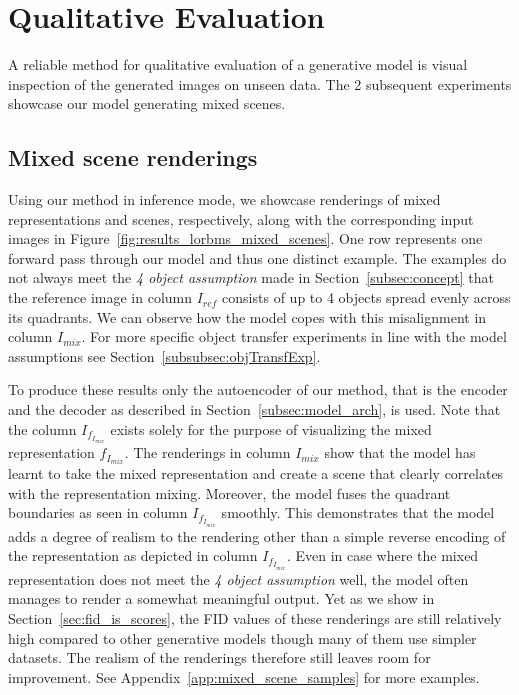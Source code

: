 \documentclass[a4paper,12pt]{report}
\begin{document}

\section{Qualitative Evaluation}\label{subsec:qual_eval}
A reliable method for qualitative evaluation of a generative model is visual inspection of the generated images on unseen data. The 2 subsequent experiments showcase our model generating mixed scenes.

\subsection{Mixed scene renderings}\label{sec:scene_renderings}
Using our method in inference mode, we showcase renderings of mixed representations and scenes, respectively, along with the corresponding input images in Figure~\ref{fig:results_lorbms_mixed_scenes}. One row represents one forward pass through our model and thus one distinct example. The examples do not always meet the \textit{4 object assumption} made in Section~\ref{subsec:concept} that the reference image in column $I_{ref}$ consists of up to 4 objects spread evenly across its quadrants. We can observe how the model copes with this misalignment in column $I_{mix}$. For more specific object transfer experiments in line with the model assumptions see Section~\ref{subsubsec:objTransfExp}. 

To produce these results only the autoencoder of our method, that is the encoder and the decoder as described in Section~\ref{subsec:model_arch}, is used. Note that the column $I_{f_{I_{mix}}}$ exists solely for the purpose of visualizing the mixed representation $f_{I_{mix}}$. The renderings in column $I_{mix}$ show that the model has learnt to take the mixed representation and create a scene that clearly correlates with the representation mixing. Moreover, the model fuses the quadrant boundaries as seen in column $I_{f_{I_{mix}}}$ smoothly. This demonstrates that the model adds a degree of realism to the rendering other than a simple reverse encoding of the representation as depicted in column $I_{f_{I_{mix}}}$. Even in case where the mixed representation does not meet the \textit{4 object assumption} well, the model often manages to render a somewhat meaningful output. Yet as we show in Section~\ref{sec:fid_is_scores}, the FID values of these renderings are still relatively high compared to other generative models though many of them use simpler datasets. The realism of the renderings therefore still leaves room for improvement.
See Appendix~\ref{app:mixed_scene_samples} for more examples.
\end{document}

